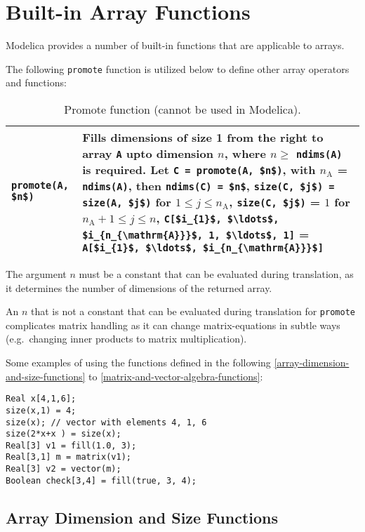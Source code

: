 \section{Built-in Array Functions}

Modelica provides a number of built-in functions that are applicable to arrays.

The following \lstinline!promote! function is
utilized below to define other array operators and functions:
\begin{longtable}[]{|l|p{9cm}|}
\caption{Promote function (cannot be used in Modelica).}\\
\hline \endhead
\lstinline!promote(A, $n$)! & Fills dimensions of size 1 from the right to array \lstinline!A! upto
dimension $n$, where $n \geq$ \lstinline!ndims(A)! is required. Let \lstinline!C = promote(A, $n$)!, with $n_{\mathrm{A}}$ = \lstinline!ndims(A)!,
then \lstinline!ndims(C) = $n$!, \lstinline!size(C, $j$) = size(A, $j$)! for $1 \leq j \leq n_{\mathrm{A}}$,
\lstinline!size(C, $j$)! = $1$ for $n_{\mathrm{A}} + 1 \leq j \leq n$, \lstinline!C[$i_{1}$, $\ldots$, $i_{n_{\mathrm{A}}}$, 1, $\ldots$, 1]! =
\lstinline!A[$i_{1}$, $\ldots$, $i_{n_{\mathrm{A}}}$]!\\ \hline
\end{longtable}
The argument $n$ must be a constant that can be evaluated during translation, as it determines
the number of dimensions of the returned array.
\begin{nonnormative}
An $n$ that is not a constant that can be evaluated during translation for \lstinline!promote!
complicates matrix handling as it
can change matrix-equations in subtle ways (e.g.\ changing inner products to matrix multiplication).
\end{nonnormative}

\begin{nonnormative}
Some examples of using the functions defined in the following
\autoref{array-dimension-and-size-functions} to \autoref{matrix-and-vector-algebra-functions}:
\begin{lstlisting}[language=modelica]
Real x[4,1,6];
size(x,1) = 4;
size(x); // vector with elements 4, 1, 6
size(2*x+x ) = size(x);
Real[3] v1 = fill(1.0, 3);
Real[3,1] m = matrix(v1);
Real[3] v2 = vector(m);
Boolean check[3,4] = fill(true, 3, 4);
\end{lstlisting}
\end{nonnormative}

\subsection{Array Dimension and Size Functions}

